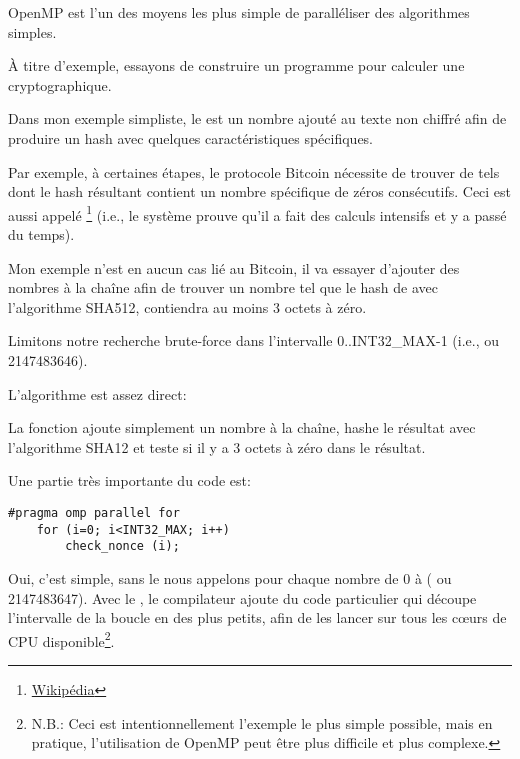 \label{openmp}

OpenMP est l'un des moyens les plus simple de paralléliser des algorithmes simples.


À titre d'exemple, essayons de construire un programme pour calculer une 
cryptographique.

Dans mon exemple simpliste, le  est un nombre ajouté au texte non chiffré
afin de produire un hash avec quelques caractéristiques spécifiques.

Par exemple, à certaines étapes, le protocole Bitcoin nécessite de trouver de tels
 dont le hash résultant contient un nombre spécifique de zéros consécutifs.
Ceci est aussi appelé 
\footnote{\href{http://go.yurichev.com/17101}{Wikipédia}}
(i.e., le système prouve qu'il a fait des calculs intensifs et y a passé du temps).

Mon exemple n'est en aucun cas lié au Bitcoin, il va essayer d'ajouter des nombres
à la chaîne afin de trouver un nombre tel que le hash de 
avec l'algorithme SHA512, contiendra au moins 3 octets à zéro.

Limitons notre recherche brute-force dans l'intervalle 0..INT32\_MAX-1 (i.e., 
ou 2147483646).

L'algorithme est assez direct:



La fonction  ajoute simplement un nombre à la chaîne, hashe le
résultat avec l'algorithme SHA12 et teste si il y a 3 octets à zéro dans le résultat.

Une partie très importante du code est:

\begin{lstlisting}[style=customc]
	#pragma omp parallel for
	for (i=0; i<INT32_MAX; i++)
		check_nonce (i);
\end{lstlisting}

Oui, c'est simple, sans le  nous appelons  pour chaque
nombre de 0 à  ( ou 2147483647).
Avec le , le compilateur ajoute du code particulier qui découpe l'intervalle
de la boucle en des plus petits, afin de les lancer sur tous les c\oe{}urs de \ac{CPU}
disponible\footnote{N.B.: Ceci est intentionnellement l'exemple le plus simple possible,
mais en pratique, l'utilisation de OpenMP peut être plus difficile et plus complexe.}.

